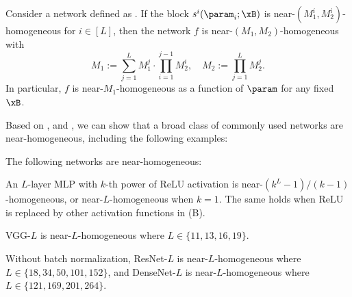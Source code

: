 \begin{corollary}
\label{cor: Near homogeneity order of networks}
Consider a network defined as .
If the block $s^i(\param_i;\xB) $ is near-$(M_1^i, M_2^i)$-homogeneous for $i\in [L]$, then the network $f$ is near-$(M_1, M_2)$-homogeneous with
\begin{equation}
\label{eq:composition_network_order}
M_1 := \sum_{j=1}^{L} M_1^j \cdot \prod_{i=1}^{j-1} M_2^i, \quad M_2 := \prod_{j=1}^{L} M_2^j.
\end{equation}
In particular, $f$ is near-$M_1$-homogeneous as a function of $\param$ for any fixed $\xB$.
\end{corollary}

Based on ,  and , we can show that a broad class of commonly used networks are near-homogeneous, including the following examples:


\begin{example}
\label{eg: Near homogeneous networks}
The following networks are near-homogeneous:
\begin{assumpenum}
    \item An $L$-layer MLP with $k$-th power of ReLU activation is near-$(k^L-1)/(k-1)$-homogeneous, or near-$L$-homogeneous when $k=1$. The same holds when ReLU is replaced by other activation functions in  (B).
    \item VGG-$L$ \citep{simonyan2015very} is near-$L$-homogeneous where $L\in\{11, 13, 16, 19\}$. 
    \item Without batch normalization, ResNet-$L$ \citep{he2016deep} is near-$L$-homogeneous where $L \in \{18,34,50,101,152\}$, and DenseNet-$L$ \citep{huang2017densely} is near-$L$-homogeneous where $L \in \{121, 169, 201, 264\}$.
\end{assumpenum}
\end{example}

